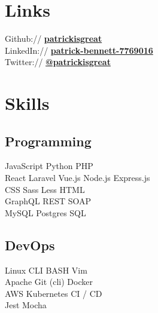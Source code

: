 \documentclass[]{pb-resume}
\begin{document}
%
%
\lastupdated

%
%

%
%

\begin{minipage}[t]{0.33\textwidth} 


\section{Links} 
Github:// \href{https://github.com/patrickisgreat}{\bf patrickisgreat} \\
LinkedIn://  \href{https://www.linkedin.com/in/patrick-bennett-7769016}{\bf patrick-bennett-7769016} \\
Twitter://  \href{https://twitter.com/patrickisgreat}{\bf @patrickisgreat} \\


\section{Skills}
\subsection{Programming}
JavaScript \textbullet{}  Python \textbullet{}  PHP \textbullet{}  \\
React \textbullet{}  Laravel \textbullet{}  Vue.js \textbullet{} 
Node.js \textbullet{}  Express.js \\ 
CSS \textbullet{} Sass \textbullet{} Less \textbullet{} HTML \\
GraphQL \textbullet{} REST \textbullet{}  SOAP \\
MySQL \textbullet{} Postgres \textbullet{} SQL \\
\sectionsep

\subsection{DevOps}
Linux CLI \textbullet{}  BASH \textbullet{}  Vim \\
Apache \textbullet{} Git (cli) \textbullet{} Docker \\
AWS \textbullet{} Kubernetes \textbullet{} CI / CD \\
Jest \textbullet{} Mocha \\
\sectionsep


\end{minipage}
\end{document}
